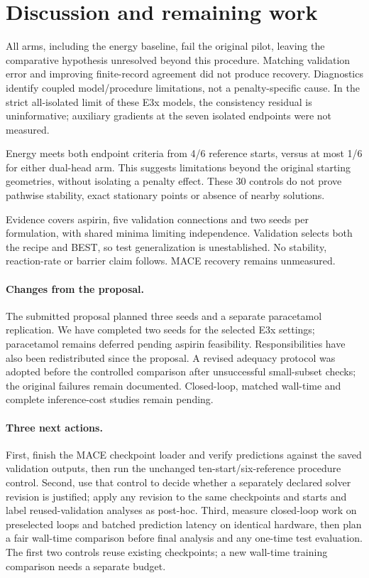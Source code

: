 \documentclass{article}
\begin{document}
\section{Discussion and remaining work}
All arms, including the energy baseline, fail the original pilot, leaving the comparative hypothesis unresolved beyond this procedure. Matching validation error and improving finite-record agreement did not produce recovery. Diagnostics identify coupled model/procedure limitations, not a penalty-specific cause. In the strict all-isolated limit of these E3x models, the consistency residual is uninformative; auxiliary gradients at the seven isolated endpoints were not measured.

Energy meets both endpoint criteria from 4/6 reference starts, versus at most 1/6 for either dual-head arm. This suggests limitations beyond the original starting geometries, without isolating a penalty effect. These 30 controls do not prove pathwise stability, exact stationary points or absence of nearby solutions.

Evidence covers aspirin, five validation connections and two seeds per formulation, with shared minima limiting independence. Validation selects both the recipe and BEST, so test generalization is unestablished. No stability, reaction-rate or barrier claim follows. MACE recovery remains unmeasured.
\paragraph{Changes from the proposal.}
The submitted proposal planned three seeds and a separate paracetamol replication. We have completed two seeds for the selected E3x settings; paracetamol remains deferred pending aspirin feasibility. Responsibilities have also been redistributed since the proposal. A revised adequacy protocol was adopted before the controlled comparison after unsuccessful small-subset checks; the original failures remain documented. Closed-loop, matched wall-time and complete inference-cost studies remain pending.
\paragraph{Three next actions.}
First, finish the MACE checkpoint loader and verify predictions against the saved validation outputs, then run the unchanged ten-start/six-reference procedure control. Second, use that control to decide whether a separately declared solver revision is justified; apply any revision to the same checkpoints and starts and label reused-validation analyses as post-hoc. Third, measure closed-loop work on preselected loops and batched prediction latency on identical hardware, then plan a fair wall-time comparison before final analysis and any one-time test evaluation. The first two controls reuse existing checkpoints; a new wall-time training comparison needs a separate budget.
\end{document}
